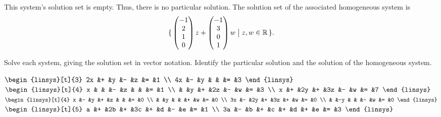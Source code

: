 \begin{exercises}
\begin{answer}
\begin{exparts}
        \partsitem This system's solution set is empty.
          Thus, there is no particular solution.
          The solution set of the associated homogeneous system is
          \begin{equation*}
            \mbox{$\{\,\begin{pmatrix} -1 \\ 2 \\ 1 \\ 0 \end{pmatrix}z
                 +\begin{pmatrix} -1 \\ 3 \\ 0 \\ 1 \end{pmatrix}w
                 \bigm| z,w\in\mathbb{R}\,\}$}.
          \end{equation*}
      \end{exparts}  
    \end{answer}
  \item 
    Solve each system, giving
    the solution set in vector notation.
    Identify the particular solution and the solution of the
    homogeneous system.
    \begin{exparts*}
      \partsitem \( \begin{linsys}[t]{3}
                  2x  &+  &y  &-  &z  &=  &1  \\
                  4x  &-  &y  &   &   &=  &3  
                  \end{linsys}  \)
      \partsitem \( \begin{linsys}[t]{4}
                   x  &   &   &-  &z  &   &   &=  &1  \\
                      &   &y  &+  &2z &-  &w  &=  &3  \\
                   x  &+  &2y &+  &3z &-  &w  &=  &7  
                   \end{linsys}  \)
      \partsitem \( \begin{linsys}[t]{4}
                   x  &-  &y  &+  &z  &   &   &=  &0  \\
                      &   &y  &   &   &+  &w  &=  &0  \\
                  3x  &-  &2y &+  &3z &+  &w  &=  &0  \\
                      &   &-y &   &   &-  &w  &=  &0  
                  \end{linsys}  \)
      \partsitem \( \begin{linsys}[t]{5}
                   a  &+  &2b &+  &3c &+  &d  &-  &e  &=  &1  \\
                  3a  &-  &b  &+  &c  &+  &d  &+  &e  &=  &3  
                  \end{linsys}  \)
    \end{exparts*}

\end{exercises}
